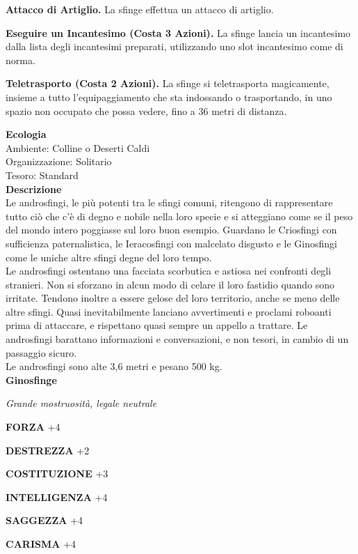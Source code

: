 \begin{multicols}{2}
\textbf{Attacco di Artiglio.} La sfinge effettua un attacco di artiglio. 

\textbf{Eseguire un Incantesimo (Costa 3 Azioni).} La sfinge lancia un incantesimo dalla lista degli incantesimi preparati, utilizzando uno slot incantesimo come di norma. 

\textbf{Teletrasporto (Costa 2 Azioni).} La sfinge si teletrasporta magicamente, insieme a tutto l'equipaggiamento che sta indossando o trasportando, in uno spazio non occupato che possa vedere, fino a 36 metri di distanza.


\textbf{Ecologia}\\
Ambiente: Colline o Deserti Caldi\\
Organizzazione: Solitario\\
Tesoro: Standard\\
\textbf{Descrizione}\\
Le androsfingi, le più potenti tra le sfingi comuni, ritengono di rappresentare tutto ciò che c'è di degno e nobile nella loro specie e si atteggiano come se il peso del mondo intero poggiasse sul loro buon esempio. Guardano le Criosfingi con sufficienza paternalistica, le Ieracosfingi con malcelato disgusto e le Ginosfingi come le uniche altre sfingi degne del loro tempo.\\

Le androsfingi ostentano una facciata scorbutica e astiosa nei confronti degli stranieri. Non si sforzano in alcun modo di celare il loro fastidio quando sono irritate. Tendono inoltre a essere gelose del loro territorio, anche se meno delle altre sfingi. Quasi inevitabilmente lanciano avvertimenti e proclami roboanti prima di attaccare, e rispettano quasi sempre un appello a trattare. Le androsfingi barattano informazioni e conversazioni, e non tesori, in cambio di un passaggio sicuro.\\
Le androsfingi sono alte 3,6 metri e pesano 500 kg.\\


\medskip{}\textbf{Ginosfinge}

\emph{Grande mostruosità, legale neutrale}

\textbf{FORZA} +4

\textbf{DESTREZZA} +2

\textbf{COSTITUZIONE} +3

\textbf{INTELLIGENZA} +4

\textbf{SAGGEZZA} +4

\textbf{CARISMA} +4


\end{multicols}
